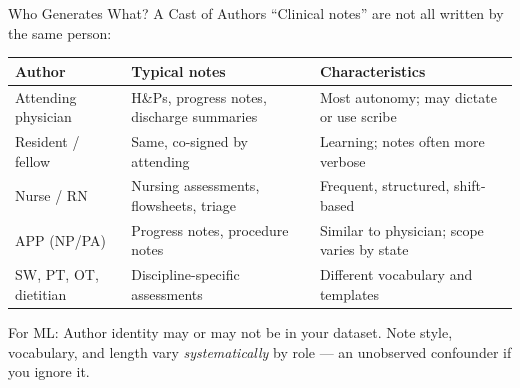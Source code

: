\documentclass[aspectratio=169,11pt]{beamer}
\begin{document}
\begin{frame}{Who Generates What? A Cast of Authors}
``Clinical notes'' are not all written by the same person:

\vspace{0.15em}
\begin{center}
\scriptsize
\renewcommand{\arraystretch}{1.0}
\begin{tabular}{lp{3.5cm}p{5.0cm}}
\toprule
\textbf{Author} & \textbf{Typical notes} & \textbf{Characteristics} \\
\midrule
Attending physician & H\&Ps, progress notes, discharge summaries & Most autonomy; may dictate or use scribe \\
Resident / fellow & Same, co-signed by attending & Learning; notes often more verbose \\
Nurse / RN & Nursing assessments, flowsheets, triage & Frequent, structured, shift-based \\
APP (NP/PA) & Progress notes, procedure notes & Similar to physician; scope varies by state \\
SW, PT, OT, dietitian & Discipline-specific assessments & Different vocabulary and templates \\
\bottomrule
\end{tabular}
\end{center}

\pause
\vspace{0.1em}
\alert{For ML:} Author identity may or may not be in your dataset. Note style, vocabulary, and length vary \emph{systematically} by role --- an unobserved confounder if you ignore it.
\end{frame}
\end{document}
